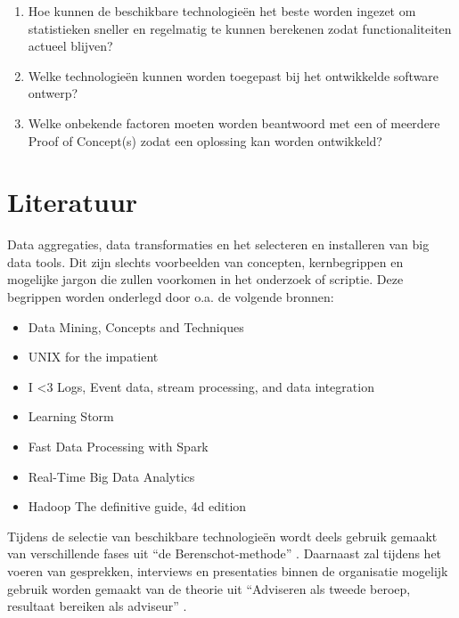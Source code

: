 \begin{enumerate}
\begin{enumerate}
    \item Hoe kunnen de beschikbare technologieën het beste worden ingezet om statistieken sneller en regelmatig te kunnen berekenen zodat functionaliteiten actueel blijven?

    \item Welke technologieën kunnen worden toegepast bij het ontwikkelde software ontwerp?

    \item Welke onbekende factoren moeten worden beantwoord met een of meerdere Proof of Concept(s) zodat een oplossing kan worden ontwikkeld?
    \end{enumerate}
\end{enumerate}


\section{Literatuur} %

Data aggregaties, data transformaties en het selecteren en installeren van big data tools. Dit zijn slechts voorbeelden van concepten, kernbegrippen en mogelijke jargon die zullen voorkomen in het onderzoek of scriptie. Deze begrippen worden onderlegd door o.a. de volgende bronnen:

\begin{itemize}
    \item Data Mining, Concepts and Techniques \parencite{data-mining}
    \item UNIX for the impatient \parencite{unix}
    \item I <3 Logs, Event data, stream processing, and data integration \parencite{logs}
    \item Learning Storm \parencite{learning-storm}
    \item Fast Data Processing with Spark \parencite{spark}
    \item Real-Time Big Data Analytics \parencite{realtime-architectures}
    \item Hadoop The definitive guide, 4d edition \parencite{hadoop-definitive}
\end{itemize}

Tijdens de selectie van beschikbare technologieën wordt deels gebruik gemaakt van verschillende fases uit “de Berenschot-methode” \parencite{cuppen}.
Daarnaast zal tijdens het voeren van gesprekken, interviews en presentaties binnen de organisatie mogelijk gebruik worden gemaakt van de theorie uit “Adviseren als tweede beroep, resultaat bereiken als adviseur” \parencite{adviseren}.

